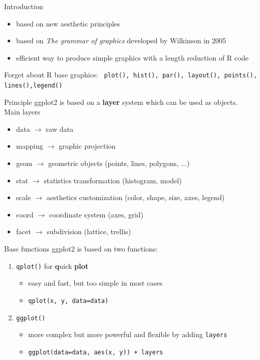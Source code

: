 \documentclass{beamer}\usepackage[]{graphicx}\usepackage[]{color}
\begin{document}
\begin{frame}{Introduction}
  \begin{itemize}
    \item based on new aesthetic principles
    \item based on \textit{The grammar of graphics} developed by Wilkinson in 2005
    \item efficient way to produce simple graphics with a length reduction of R code
  \end{itemize}
  
  \begin{alertblock}{Forget about R base graphics:}
     \texttt{ plot(), hist(), par(), layout(), points(), lines(),legend()}
  \end{alertblock}
\end{frame}

\begin{frame}{Principle}
ggplot2 is based on a \textbf{layer} system which can be used as objects.\\
\vspace{1cm}
Main layers
  \begin{itemize}
    \item data $\rightarrow$ raw data
    \item mapping $\rightarrow$ graphic projection
    \item geom $\rightarrow$ geometric objects (points, lines, polygons, ...)
    \item stat $\rightarrow$ statistics transformation (histogram, model)
    \item scale $\rightarrow$ aesthetics customization (color, shape, size, axes, legend)
    \item coord $\rightarrow$ coordinate system (axes, grid)
    \item facet $\rightarrow$ subdivision (lattice, trellis)
  \end{itemize}
\end{frame}

\begin{frame}{Base functions}
ggplot2 is based on two functions:
  \begin{enumerate}
		\item  \texttt{qplot()} for \textbf{q}uick \textbf{plot}
		\begin{itemize}
			\item easy and fast, but too simple in most cases
			\item \texttt{qplot(x, y, data=data)}
		\end{itemize}
    \vspace{0.5cm}
    \item \texttt{ggplot()}
      	\begin{itemize}
			\item more complex but more powerful and flexible by adding \texttt{layers}
			\item \texttt{ggplot(data=data, aes(x, y)) + layers}
		\end{itemize}
  \end{enumerate}
\end{frame}
\end{document}
